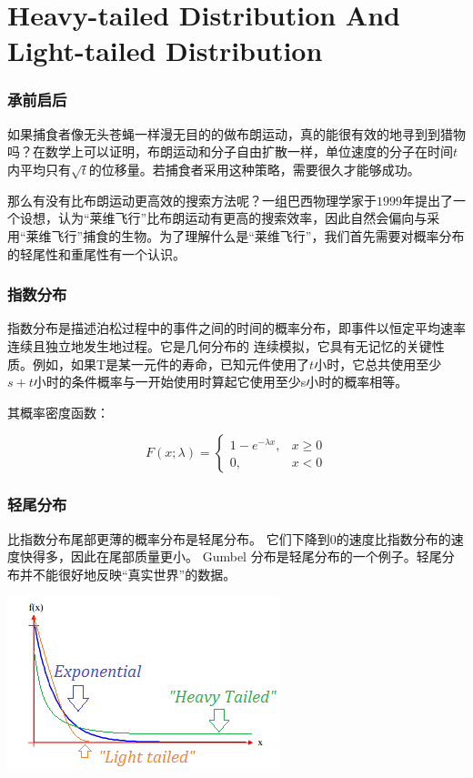 \section{Heavy-tailed Distribution And Light-tailed Distribution}	

\begin{frame}

\frametitle{承前启后}
\qquad 如果捕食者像无头苍蝇一样漫无目的的做布朗运动，真的能很有效的地寻到到猎物吗？在数学上可以证明，布朗运动和分子自由扩散一样，单位速度的分子在时间$t$内平均只有$\sqrt{t}$的位移量。若捕食者采用这种策略，需要很久才能够成功。

\qquad 那么有没有比布朗运动更高效的搜索方法呢？一组巴西物理学家于$1999$年提出了一个设想，认为“莱维飞行”比布朗运动有更高的搜索效率，因此自然会偏向与采用“莱维飞行”捕食的生物。为了理解什么是“莱维飞行”，我们首先需要对概率分布的轻尾性和重尾性有一个认识。

\end{frame}
	
\begin{frame}
\frametitle{指数分布}
指数分布是描述泊松过程中的事件之间的时间的概率分布，即事件以恒定平均速率连续且独立地发生地过程。它是几何分布的
连续模拟，它具有无记忆的关键性质。例如，如果T是某一元件的寿命，已知元件使用了$t$小时，它总共使用至少$s+t$小时的条件概率与一开始使用时算起它使用至少s小时的概率相等。

其概率密度函数：

\begin{displaymath}
F\left ( x;\lambda  \right )= \left\{\begin{matrix}
1-e^{-\lambda x}, &x\geq 0  \\
0, &x< 0
\end{matrix}\right.
\end{displaymath}

\end{frame}

\begin{frame}
\frametitle{轻尾分布}
\qquad 比指数分布尾部更薄的概率分布是轻尾分布。 它们下降到$0$的速度比指数分布的速度快得多，因此在尾部质量更小。 Gumbel 分布是轻尾分布的一个例子。轻尾分布并不能很好地反映“真实世界”的数据。



\centering\includegraphics[scale=0.5]{images/light-tailed.png}


\end{frame}

